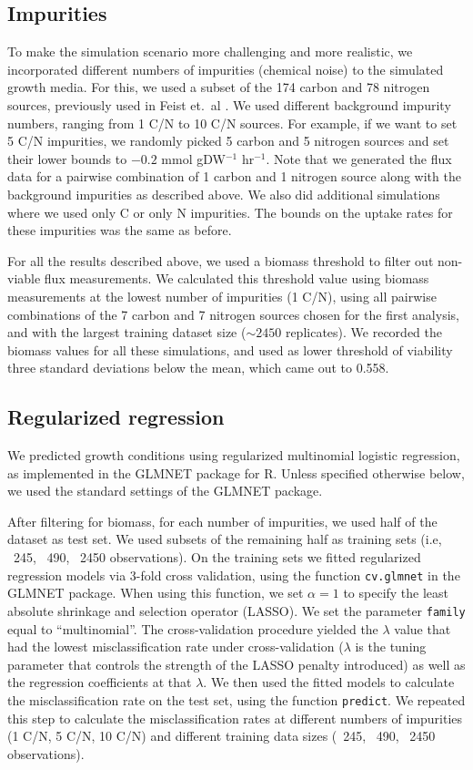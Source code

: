 \documentclass[12pt]{article}
\begin{document}
\subsection{Impurities}
To make the simulation scenario more challenging and more realistic, we incorporated different numbers of impurities (chemical noise) to the simulated growth media. For this, we used a subset of the 174 carbon and 78 nitrogen sources, previously used in Feist et.\ al \cite{Feistetal2007}.  We used different background impurity numbers, ranging from 1 C/N to 10 C/N sources. For example, if we want to set 5 C/N impurities, we randomly picked 5 carbon and 5 nitrogen sources and set their lower bounds to $-0.2$ mmol gDW$^{-1}$ hr$^{-1}$. Note that we generated the flux data for a pairwise combination of 1 carbon and 1 nitrogen source along with the background impurities as described above. We also did additional simulations where we used only C or only N impurities. The bounds on the uptake rates for these impurities was the same as before.

For all the results described above, we used a biomass threshold to filter out non-viable flux measurements. We calculated this threshold value using biomass measurements at the lowest number of impurities (1 C/N), using all pairwise combinations of the 7 carbon and 7 nitrogen sources chosen for the first analysis, and with the largest training dataset size ($\sim2450$ replicates). We recorded the biomass values for all these simulations, and used as lower threshold of viability three standard deviations below the mean, which came out to 0.558.

\subsection{Regularized regression}

We predicted growth conditions using regularized multinomial logistic regression, as implemented in the GLMNET package \cite{Friedmanetal2010} for R. Unless specified otherwise below, we used the standard settings of the GLMNET package.

After filtering for biomass, for each number of impurities, we used half of the dataset as test set. We used subsets of the remaining half as training sets (i.e, ~245, ~490, ~2450 observations). On the training sets we fitted regularized regression models via 3-fold cross validation, using the function \texttt{cv.glmnet} in the GLMNET package. When using this function, we set $\alpha=1$ to specify the least absolute shrinkage and selection operator (LASSO). We set the parameter \texttt{family} equal to ``multinomial''. The cross-validation procedure yielded the  $\lambda$ value that had the lowest misclassification rate under cross-validation ($\lambda$ is the tuning parameter that controls the strength of the LASSO penalty introduced) as well as the regression coefficients at that $\lambda$. We then used the fitted models to calculate the misclassification rate on the test set, using the function \texttt{predict}. We repeated this step to calculate the misclassification rates at different numbers of impurities (1 C/N, 5 C/N, 10 C/N) and different training data sizes (~245, ~490, ~2450 observations).
\end{document}
